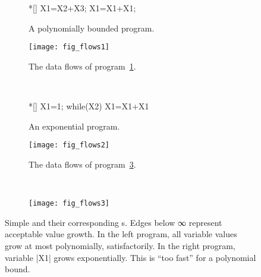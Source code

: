 \begin{figure}[H]
\centering
\begin{subfigure}{.45\textwidth}
\centering\begin{minipage}{.7\textwidth}
\begin{implisting}*[]
X1=X2+X3;
X1=X1+X1;
\end{implisting}
\end{minipage}
\caption{A polynomially bounded program.}\label{lst:simple-dfg-1}
\end{subfigure}\hfill
\begin{subfigure}{.45\textwidth}
\begin{center}
\texttt{[image: fig\_flows1]}
\end{center}
\caption{The data flows of program~\ref{lst:simple-dfg-1}.}%
\label{fig:simple-dfg-1}
\end{subfigure}\\[1em]
\begin{subfigure}{.45\textwidth}
\centering\begin{minipage}{.7\textwidth}
\begin{implisting}*[]
X1=1;
while(X2)
  X1=X1+X1
\end{implisting}
\end{minipage}
\caption{An exponential program.}\label{lst:simple-dfg-2}
\end{subfigure}\hfill
\begin{subfigure}{.45\textwidth}
\begin{center}
\texttt{[image: fig\_flows2]}
\end{center}
\caption{The data flows of program~\ref{lst:simple-dfg-2}.}%
\label{fig:simple-dfg-2}
\end{subfigure}\\[1em]
\begin{subfigure}{\textwidth}
\centering\texttt{[image: fig\_flows3]}
\end{subfigure}
\caption[Simple imperative programs and their corresponding data flow graphs]{
Simple  and their corresponding s.
Edges below ∞ represent acceptable value growth. In the left
program, all variable values grow at most polynomially, \ie satisfactorily. In
the right program, variable \pr|X1| grows exponentially. This is \enquote{too
fast} for a polynomial bound.
}\label{fig:dfg-ex}
\end{figure}

